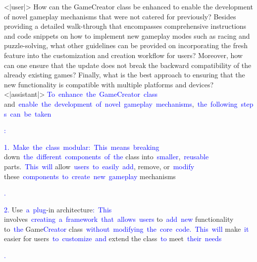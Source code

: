 \documentclass{article}
\begin{document}
\begin{tcolorbox}[colframe=black,colback=white]
<|user|>
How can the GameCreator class be enhanced to enable the development of novel gameplay mechanisms that were not catered for previously? Besides providing a detailed walk-through that encompasses comprehensive instructions and code snippets on how to implement new gameplay modes such as racing and puzzle-solving, what other guidelines can be provided on incorporating the fresh feature into the customization and creation workflow for users? Moreover, how can one ensure that the update does not break the backward compatibility of the already existing games? Finally, what is the best approach to ensuring that the new functionality is compatible with multiple platforms and devices?
<|assistant|>
\textcolor{blue}{To}\textcolor{blue}{~enhance}\textcolor{blue}{~the}\textcolor{blue}{~Game}\textcolor{blue}{Creator}\textcolor{blue}{~class} and\textcolor{blue}{~enable}\textcolor{blue}{~the}\textcolor{blue}{~development}\textcolor{blue}{~of}\textcolor{blue}{~novel}\textcolor{blue}{~gameplay}\textcolor{blue}{~mechanisms},\textcolor{blue}{~the}\textcolor{blue}{~following}\textcolor{blue}{~steps}\textcolor{blue}{~can}\textcolor{blue}{~be}\textcolor{blue}{~taken}\textcolor{blue}{:

}\textcolor{blue}{1}\textcolor{blue}{.}\textcolor{blue}{~Make}\textcolor{blue}{~the}\textcolor{blue}{~class}\textcolor{blue}{~modular}\textcolor{blue}{:}\textcolor{blue}{~This}\textcolor{blue}{~means}\textcolor{blue}{~breaking} down\textcolor{blue}{~the}\textcolor{blue}{~different}\textcolor{blue}{~components}\textcolor{blue}{~of}\textcolor{blue}{~the} class into\textcolor{blue}{~smaller},\textcolor{blue}{~reusable} parts.\textcolor{blue}{~This}\textcolor{blue}{~will} allow\textcolor{blue}{~users}\textcolor{blue}{~to}\textcolor{blue}{~easily}\textcolor{blue}{~add}, remove, or\textcolor{blue}{~modify} these\textcolor{blue}{~components}\textcolor{blue}{~to}\textcolor{blue}{~create}\textcolor{blue}{~new}\textcolor{blue}{~gameplay} mechanisms\textcolor{blue}{.

}\textcolor{blue}{2}\textcolor{blue}{.} Use\textcolor{blue}{~a}\textcolor{blue}{~plug}-in architecture\textcolor{blue}{:}\textcolor{blue}{~This} involves\textcolor{blue}{~creating}\textcolor{blue}{~a}\textcolor{blue}{~framework}\textcolor{blue}{~that}\textcolor{blue}{~allows}\textcolor{blue}{~users} to\textcolor{blue}{~add}\textcolor{blue}{~new} functionality to\textcolor{blue}{~the} Game\textcolor{blue}{Creator} class\textcolor{blue}{~without}\textcolor{blue}{~modifying}\textcolor{blue}{~the}\textcolor{blue}{~core}\textcolor{blue}{~code}\textcolor{blue}{.}\textcolor{blue}{~This}\textcolor{blue}{~will} make\textcolor{blue}{~it} easier for users\textcolor{blue}{~to}\textcolor{blue}{~customize}\textcolor{blue}{~and} extend the class\textcolor{blue}{~to} meet\textcolor{blue}{~their}\textcolor{blue}{~needs}\textcolor{blue}{.

}
\end{tcolorbox}
\end{document}
